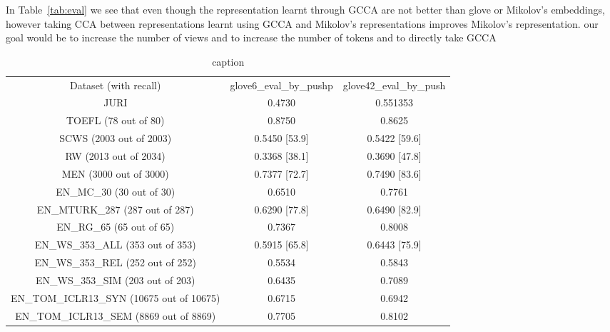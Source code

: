 \documentclass[11pt]{article}
\begin{document}
In Table~\ref{tab:eval} we see that even though the representation
learnt through GCCA are not better than glove or Mikolov's embeddings,
however taking CCA between representations learnt using GCCA and
Mikolov's representations improves Mikolov's representation. our goal
would be to increase the number of views and to increase the number of
tokens and to directly take GCCA 

\begin{table*}[htbp]
  \centering
  \begin{tabular}{ccc}
Dataset (with recall)                     & glove6\_eval\_by\_pushp & glove42\_eval\_by\_push  \\
JURI                                      &        0.4730           &       0.551353           \\
TOEFL (78 out of 80)                      &        0.8750           &      0.8625              \\
SCWS (2003 out of 2003)                   &        0.5450    [53.9] &      0.5422  [59.6]      \\
RW (2013 out of 2034)                     &        0.3368    [38.1] &      0.3690  [47.8]      \\
MEN (3000 out of 3000)                    &        0.7377    [72.7] &      0.7490  [83.6]      \\
EN\_MC\_30 (30 out of 30)                 &        0.6510           &        0.7761            \\
EN\_MTURK\_287 (287 out of 287)           &        0.6290    [77.8] &        0.6490  [82.9]    \\
EN\_RG\_65 (65 out of 65)                 &        0.7367           &        0.8008            \\
EN\_WS\_353\_ALL (353 out of 353)         &        0.5915    [65.8] &         0.6443  [75.9]   \\
EN\_WS\_353\_REL (252 out of 252)         &        0.5534           &         0.5843           \\
EN\_WS\_353\_SIM (203 out of 203)         &        0.6435           &         0.7089           \\
EN\_TOM\_ICLR13\_SYN (10675 out of 10675) &        0.6715           &         0.6942           \\
EN\_TOM\_ICLR13\_SEM (8869 out of 8869)   &        0.7705           &         0.8102           \\
    
  \end{tabular}
  \caption{caption}
  \label{tab:glove}
\end{table*}
\end{document}
